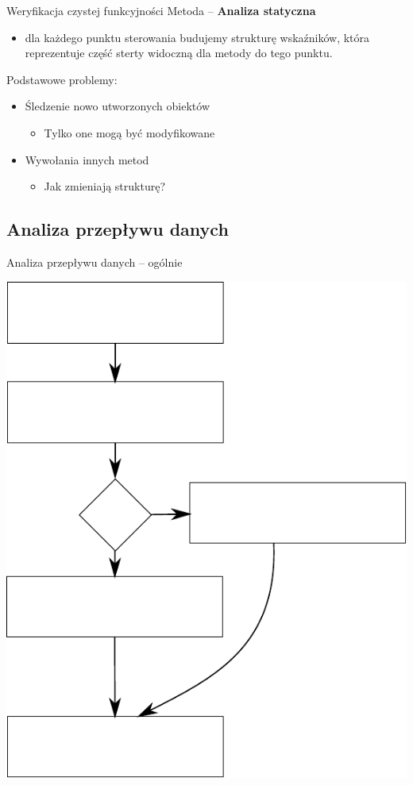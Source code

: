 \documentclass[handout]{beamer}
\begin{document}
\begin{frame}{Weryfikacja czystej funkcyjności}
  Metoda -- \textbf{Analiza statyczna}
  \begin{itemize}
    \item dla każdego punktu sterowania
    budujemy strukturę wskaźników, która reprezentuje część sterty
    widoczną dla metody do tego punktu.
  \end{itemize}
  \pause
  Podstawowe problemy:
  \begin{itemize}
  \item<2-> Śledzenie nowo utworzonych obiektów
    \begin{itemize}
    \item Tylko one mogą być modyfikowane
    \end{itemize}
  \item<3-> Wywołania innych metod
    \begin{itemize}
    \item Jak zmieniają strukturę?
    \end{itemize}
  \end{itemize}
  \pause
\end{frame}

\subsection{Analiza przepływu danych}

\begin{frame}{Analiza przepływu danych -- ogólnie}
\begin{center}
  \includegraphics[scale=0.55]{img/dataflow.pdf}  
\end{center}
\end{frame}
\end{document}
